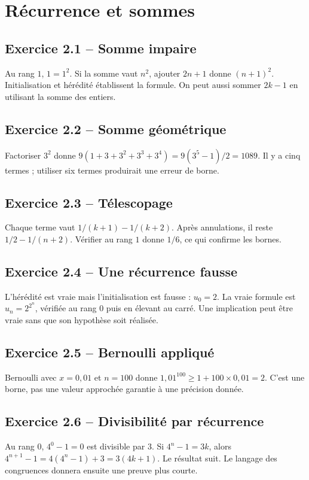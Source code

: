 \chapter{Récurrence et sommes}
\section*{Exercice 2.1 -- Somme impaire}
Au rang $1$, $1=1^2$. Si la somme vaut $n^2$, ajouter $2n+1$ donne $(n+1)^2$. Initialisation et hérédité établissent la formule. On peut aussi sommer $2k-1$ en utilisant la somme des entiers.

\section*{Exercice 2.2 -- Somme géométrique}
Factoriser $3^2$ donne $9(1+3+3^2+3^3+3^4)=9(3^5-1)/2=1089$. Il y a cinq termes ; utiliser six termes produirait une erreur de borne.

\section*{Exercice 2.3 -- Télescopage}
Chaque terme vaut $1/(k+1)-1/(k+2)$. Après annulations, il reste $1/2-1/(n+2)$. Vérifier au rang $1$ donne $1/6$, ce qui confirme les bornes.

\section*{Exercice 2.4 -- Une récurrence fausse}
L'hérédité est vraie mais l'initialisation est fausse : $u_0=2$. La vraie formule est $u_n=2^{2^n}$, vérifiée au rang $0$ puis en élevant au carré. Une implication peut être vraie sans que son hypothèse soit réalisée.

\section*{Exercice 2.5 -- Bernoulli appliqué}
Bernoulli avec $x=0{,}01$ et $n=100$ donne $1{,}01^{100}\ge1+100\times0{,}01=2$. C'est une borne, pas une valeur approchée garantie à une précision donnée.

\section*{Exercice 2.6 -- Divisibilité par récurrence}
Au rang $0$, $4^0-1=0$ est divisible par $3$. Si $4^n-1=3k$, alors $4^{n+1}-1=4(4^n-1)+3=3(4k+1)$. Le résultat suit. Le langage des congruences donnera ensuite une preuve plus courte.
